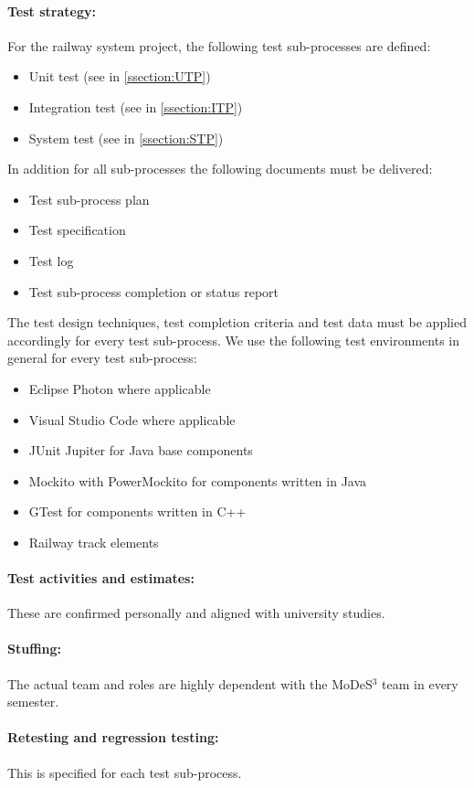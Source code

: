 \paragraph{Test strategy:} 
For the railway system project, the following test sub-processes are defined:
\begin{itemize}
	\item Unit test (see in \autoref{ssection:UTP})
	\item Integration test (see in \autoref{ssection:ITP})
	\item System test (see in \autoref{ssection:STP})
\end{itemize}
In addition for all sub-processes the following documents must be delivered:
\begin{itemize}
	\item Test sub-process plan
	\item Test specification
	\item Test log
	\item Test sub-process completion or status report
\end{itemize}
The test design techniques, test completion criteria and test data must be applied accordingly for every test sub-process. We use the following test environments in general for every test sub-process:
\begin{itemize}
	\item Eclipse Photon where applicable
	\item Visual Studio Code where applicable
	\item JUnit Jupiter for Java base components
	\item Mockito with PowerMockito for components written in Java
	\item GTest for components written in C++
	\item Railway track elements
\end{itemize}
\paragraph{Test activities and estimates:} These are confirmed personally and aligned with university studies.
\paragraph{Stuffing:} The actual team and roles are highly dependent with the MoDeS$^3$ team in every semester.
\paragraph{Retesting and regression testing:} This is specified for each test sub-process. 

